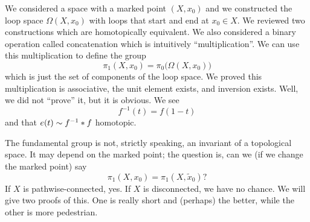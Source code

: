 
We considered a space with a marked point $(X,x_0)$ and we
constructed the loop space $\Omega(X,x_0)$ with loops that start
and end at $x_0\in X$. We reviewed two constructions which are
homotopically equivalent. We also considered a binary operation
called concatenation which is intuitively ``multiplication''. We
can use this multiplication to define the group
\begin{equation}
\pi_{1}(X,x_0)=\pi_{0}\bigl(\Omega(X,x_0)\bigr)
\end{equation}
which is just the set of components of the loop space. We proved
this multiplication is associative, the unit element exists, and
inversion exists. Well, we did not ``prove'' it, but it is
obvious. We see
\begin{equation}
f^{-1}(t)=f(1-t)
\end{equation}
and that $e(t)\sim f^{-1}*f$ homotopic.

The fundamental group is not, strictly speaking, an invariant of
a topological space. It may depend on the marked point; the
question is, can we (if we change the marked point) say
\begin{equation}
\pi_{1}(X,x_0)=\pi_{1}(X,\widetilde{x}_{0})?
\end{equation}
If $X$ is pathwise-connected, yes. If $X$ is disconnected, we
have no chance. We will give two proofs of this. One is really
short and (perhaps) the better, while the other is more
pedestrian. 

